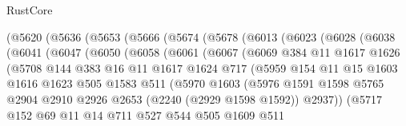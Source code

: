 \begin{lexlean}{RustCore}
\begin{coremodule}
    (@5620
      (@5636
        (@5653
          (@5666
            (@5674
              (@5678
                (@6013
                  (@6023
                    (@6028
                      (@6038
                        (@6041
                          (@6047
                            (@6050
                              (@6058
                                (@6061
                                  (@6067
                                    (@6069
                                      @384
                                      @11
                                      @1617
                                      @1626
                                      (@5708
                                        @144
                                        @383
                                        @16
                                        @11
                                        @1617
                                        @1624
                                        @717
                                        (@5959
                                          @154
                                          @11
                                          @15
                                          @1603
                                          @1616
                                          @1623
                                          @505
                                          @1583
                                          @511
                                          (@5970
                                            @1603
                                            (@5976
                                              @1591
                                              @1598
                                              @5765
                                              @2904
                                              @2910
                                              @2926
                                              @2653
                                              (@2240 (@2929 @1598 @1592))
                                              @2937))
                                          (@5717
                                            @152
                                            @69
                                            @11
                                            @14
                                            @711
                                            @527
                                            @544
                                            @505
                                            @1609
                                            @511

\end{coremodule}
\end{lexlean}

